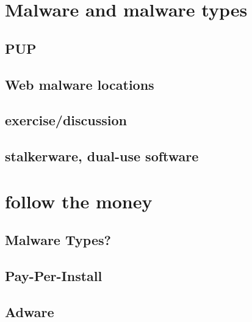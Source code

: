 




\section{Malware and malware types}


\subsection{PUP}


\subsection{Web malware locations}


\subsection{exercise/discussion}


\subsection{stalkerware, dual-use software}


\section{follow the money}


\subsection{Malware Types?}


\subsection{Pay-Per-Install}


\subsection{Adware}


